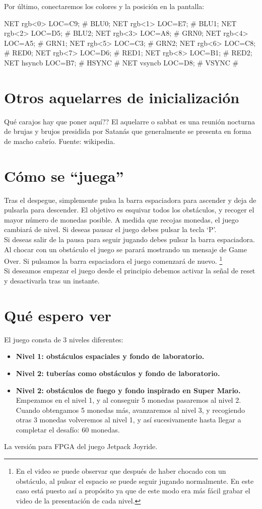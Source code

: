 \documentclass[11pt, a4paper, spanish, openright, twoside]{book}
\begin{document}
Por último, conectaremos los colores y la posición en la pantalla:

NET rgb<0> LOC=C9; \# BLU0;
NET rgb<1> LOC=E7; \# BLU1;
NET rgb<2> LOC=D5; \# BLU2;
NET rgb<3> LOC=A8; \# GRN0; 
NET rgb<4> LOC=A5; \#  GRN1;
NET rgb<5> LOC=C3; \# GRN2;
NET rgb<6> LOC=C8; \# RED0;
NET rgb<7> LOC=D6; \# RED1;
NET rgb<8> LOC=B1; \# RED2;
NET hsyncb LOC=B7; \# HSYNC \# 
NET vsyncb LOC=D8; \# VSYNC \# 

\section{Otros aquelarres de inicialización}
Qué carajos hay que poner aquí??
El aquelarre o sabbat es una reunión nocturna de brujas y brujos presidida por Satanás que generalmente se presenta en forma de macho cabrío. Fuente: wikipedia.

\section{Cómo se ``juega''}
Tras el despegue, simplemente pulsa la barra espaciadora para ascender y deja de pulsarla para descender.  El objetivo es esquivar todos los obstáculos, y recoger el mayor número de monedas posible. A medida que recojas monedas, el juego cambiará de nivel.
Si deseas pausar el juego debes pulsar la tecla `P'.\\
Si deseas salir de la pausa para seguir jugando debes pulsar la barra espaciadora. \\
Al chocar con un obstáculo el juego se parará mostrando un mensaje de Game Over.  Si pulsamos la barra espaciadora el juego comenzará de nuevo. \footnote{En el video se puede observar que después de haber chocado con un obstáculo, al pulsar el espacio se puede seguir jugando normalmente. En este caso está puesto así a propósito ya que de este modo era más fácil grabar el video de la presentación de cada nivel.}\\
Si deseamos empezar el juego desde el principio debemos activar la señal de reset y desactivarla tras un instante. 



\section{Qué espero ver}
El juego consta de 3 niveles diferentes:
\begin{itemize}
\item \textbf{Nivel 1: obstáculos espaciales y fondo de laboratorio.}
\item \textbf{Nivel 2: tuberías como obstáculos y fondo de laboratorio.}
\item \textbf{Nivel 2: obstáculos de fuego y fondo inspirado en Super Mario.}
Empezamos en el nivel 1, y al conseguir 5 monedas pasaremos al nivel 2. Cuando obtengamos 5 monedas más, avanzaremos al nivel 3, y recogiendo otras 3 monedas volveremos al nivel 1, y así sucesivamente hasta llegar a completar el desafío: 60 monedas.
\end{itemize}
La versión para FPGA del juego Jetpack Joyride. 
\end{document}
